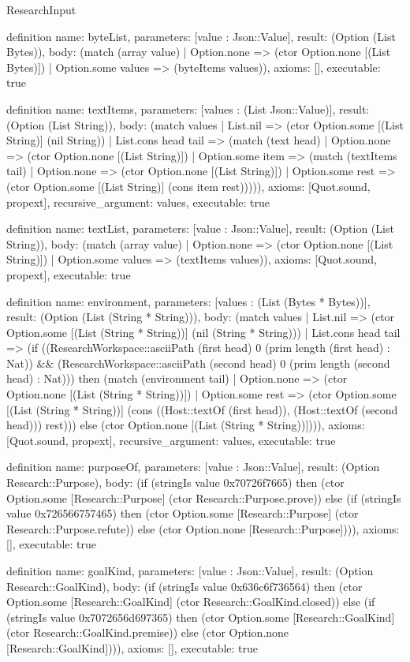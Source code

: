 \begin{lexlean}{ResearchInput}
\begin{semanticmodule}
definition{
 name: byteList,
 parameters: [value : Json::Value],
 result: (Option (List Bytes)),
 body: (match (array value) | Option.none => (ctor Option.none [(List Bytes)]) | Option.some values => (byteItems values)),
 axioms: [],
 executable: true
}

definition{
 name: textItems,
 parameters: [values : (List Json::Value)],
 result: (Option (List String)),
 body: (match values | List.nil => (ctor Option.some [(List String)] (nil String)) | List.cons head tail => (match (text head) | Option.none => (ctor Option.none [(List String)]) | Option.some item => (match (textItems tail) | Option.none => (ctor Option.none [(List String)]) | Option.some rest => (ctor Option.some [(List String)] (cons item rest))))),
 axioms: [Quot.sound, propext],
 recursive_argument: values,
 executable: true
}

definition{
 name: textList,
 parameters: [value : Json::Value],
 result: (Option (List String)),
 body: (match (array value) | Option.none => (ctor Option.none [(List String)]) | Option.some values => (textItems values)),
 axioms: [Quot.sound, propext],
 executable: true
}

definition{
 name: environment,
 parameters: [values : (List (Bytes * Bytes))],
 result: (Option (List (String * String))),
 body: (match values | List.nil => (ctor Option.some [(List (String * String))] (nil (String * String))) | List.cons head tail => (if ((ResearchWorkspace::asciiPath (first head) 0 (prim length (first head) : Nat)) && (ResearchWorkspace::asciiPath (second head) 0 (prim length (second head) : Nat))) then (match (environment tail) | Option.none => (ctor Option.none [(List (String * String))]) | Option.some rest => (ctor Option.some [(List (String * String))] (cons ((Host::textOf (first head)), (Host::textOf (second head))) rest))) else (ctor Option.none [(List (String * String))]))),
 axioms: [Quot.sound, propext],
 recursive_argument: values,
 executable: true
}

definition{
 name: purposeOf,
 parameters: [value : Json::Value],
 result: (Option Research::Purpose),
 body: (if (stringIs value 0x70726f7665) then (ctor Option.some [Research::Purpose] (ctor Research::Purpose.prove)) else (if (stringIs value 0x726566757465) then (ctor Option.some [Research::Purpose] (ctor Research::Purpose.refute)) else (ctor Option.none [Research::Purpose]))),
 axioms: [],
 executable: true
}

definition{
 name: goalKind,
 parameters: [value : Json::Value],
 result: (Option Research::GoalKind),
 body: (if (stringIs value 0x636c6f736564) then (ctor Option.some [Research::GoalKind] (ctor Research::GoalKind.closed)) else (if (stringIs value 0x7072656d697365) then (ctor Option.some [Research::GoalKind] (ctor Research::GoalKind.premise)) else (ctor Option.none [Research::GoalKind]))),
 axioms: [],
 executable: true
}


\end{semanticmodule}
\end{lexlean}
